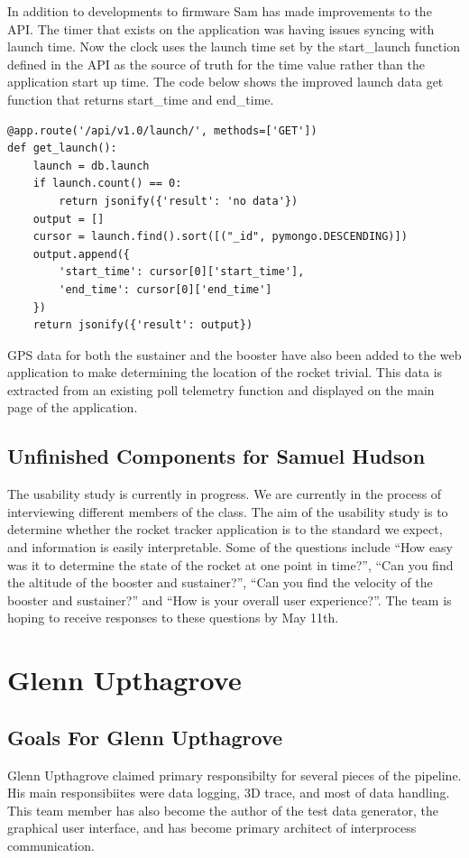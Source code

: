 \documentclass[onecolumn, draftclsnofoot,10pt, compsoc]{IEEEtran}
\begin{document}
In addition to developments to firmware Sam has made improvements to the API. The timer that exists on the application was having issues syncing with launch time. Now the clock uses the launch time set by the start\_launch function defined in the API as the source of truth for the time value rather than the application start up time. The code below shows the improved launch data get function that returns start\_time and end\_time. 
\begin{lstlisting}
@app.route('/api/v1.0/launch/', methods=['GET'])
def get_launch():
    launch = db.launch
    if launch.count() == 0:
        return jsonify({'result': 'no data'})
    output = []
    cursor = launch.find().sort([("_id", pymongo.DESCENDING)])
    output.append({
        'start_time': cursor[0]['start_time'],
        'end_time': cursor[0]['end_time']
    })
    return jsonify({'result': output})
\end{lstlisting}
GPS data for both the sustainer and the booster have also been added to the web application to make determining the location of the rocket trivial. This data is extracted from an existing poll telemetry function and displayed on the main page of the application. 
\subsection{Unfinished Components for Samuel Hudson}
The usability study is currently in progress. We are currently in the process of interviewing different members of the class. The aim of the usability study is to determine whether the rocket tracker application is to the standard we expect, and information is easily interpretable. Some of the questions include “How easy was it to determine the state of the rocket at one point in time?”, “Can you find the altitude of the booster and sustainer?”, “Can you find the velocity of the booster and sustainer?” and “How is your overall user experience?”. The team is hoping to receive responses to these questions by May 11th. 

\section {Glenn Upthagrove} 
\subsection {Goals For Glenn Upthagrove}
Glenn Upthagrove claimed primary responsibilty for several pieces of the pipeline. His main responsibiites were data logging, 3D trace, and most of data handling. This team member has also become the author of the test data generator, the graphical user interface, and has become primary architect of interprocess communication.
\end{document}
